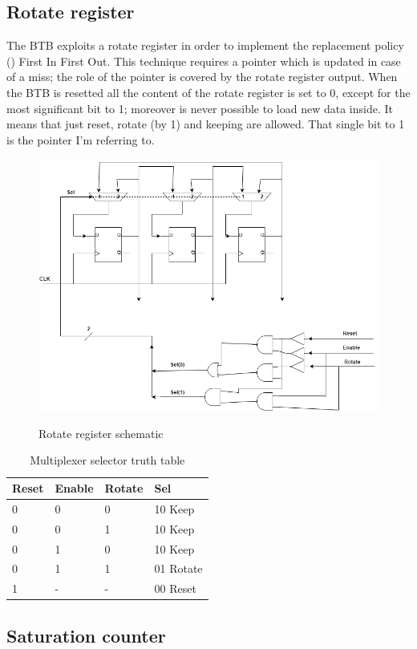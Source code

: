 \subsection{Rotate register}
The BTB exploits a rotate register in order to implement the replacement policy (\cite{EFESbook}) First In First Out. This technique requires a pointer which is updated in case of a miss; the role of the pointer is covered by the rotate register output. When the BTB is resetted all the content of the rotate register is set to 0, except for the most significant bit to 1; moreover is never possible to load new data inside. It means that just reset, rotate (by 1) and keeping are allowed. That single bit to 1 is the pointer I'm referring to.

\begin{figure}[H]
\centering
\includegraphics[scale=.6]{Immagini/14}
\label{14}
\caption{Rotate register schematic}
\end{figure}

\begin{table}[H]
\centering
\begin{tabular}{|p{}|p{}|p{}|p{}|}
\hline
\textbf{Reset}&\textbf{\textbf{Enable}}&\textbf{Rotate}&\textbf{Sel}\\ \hline
0 & 0 & 0 & 10 Keep\\ \hline
0 & 0 & 1 & 10 Keep\\ \hline
0 & 1 & 0 & 10 Keep\\ \hline
0 & 1 & 1 & 01 Rotate\\ \hline
1 & - & - & 00 Reset\\ \hline

\end{tabular}
\caption{Multiplexer selector  truth table}
\end{table}

\subsection{Saturation counter}